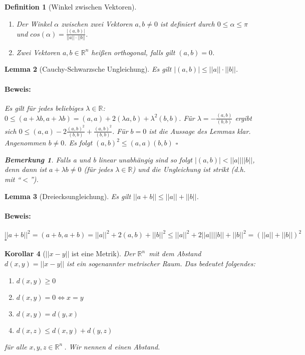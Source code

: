 \documentclass{report}
\newcommand{\lb}{\lambda}
\newcommand{\R}{\mathbb{R}}
\newcommand{\Rn}{\mathbb{R}^n\ }
\newcommand{\mRn}{$\mathbb{R}^n$\ }
\newcommand{\al}{\alpha}
\theoremstyle{customrem}
\newtheorem*{bem}{Bemerkung}
\theoremstyle{customdef}
\newtheorem{definition}{Definition}[chapter]
\newtheorem{lem}[definition]{Lemma}
\newtheorem{kor}[definition]{Korollar}
\renewenvironment{proof}{\vspace{-.75cm}\paragraph{Beweis: }}{\hfill$\square$}
\begin{document}
	\begin{definition}[Winkel zwischen Vektoren]$ $\vspace{-.5cm}
		\begin{enumerate}
			\item Der Winkel $\al$ zwischen zwei Vektoren $a, b \neq 0$ ist definiert durch $0 \le \al \le \pi$ und $cos(\al) = \frac{|(a,b)|}{||a||\cdot ||b||}$.
			\item Zwei Vektoren $a, b \in \R^n$ heißen orthogonal, falls gilt $(a, b) = 0$.
		\end{enumerate}
	\end{definition}
	\begin{lem}[Cauchy-Schwarzsche Ungleichung]
		Es gilt $|(a, b)| \le ||a||\cdot||b||$.\\
		\begin{proof}
			Es gilt für jedes beliebiges $\lb \in \R$:
			$0 \le (a + \lb b, a + \lb b) = (a, a) + 2 (\lb a, b) + \lb^2 (b, b)$.	Für $\lb = -\frac{(a,b)}{(b, b)}$ ergibt sich $0 \le (a, a) - 2 \frac{(a, b)^2}{(b, b)} + \frac{(a, b)^2}{(b, b)}$.
			Für $b = 0$ ist die Aussage des Lemmas klar. Angenommen $b \neq 0$. Es folgt 
			$(a,b)^2 \le (a, a)(b,b)$
		\end{proof} 
		\begin{bem}
			Falls a und b linear unabhängig sind so folgt $|(a,b)| < ||a||||b||$, denn dann ist $a + \lb b \neq 0$ (für jedes $\lb \in \R$) und die Ungleichung ist strikt (d.h. mit "`$<$"').
		\end{bem}
	\end{lem}
	\begin{lem}[Dreiecksungleichung]
		Es gilt $||a+b|| \le ||a|| + ||b||$.\\
		\begin{proof}
			$ ||a+b||^2 = (a+b, a+b)= ||a||^2 + 2(a,b) + ||b||^2 \le ||a||^2 + 2 ||a||||b|| + ||b||^2 = (||a|| + ||b||)^2$
		\end{proof}
		
	\end{lem}
	\begin{kor}[$||x-y||$ ist eine Metrik]
		Der \mRn mit dem Abstand $d(x, y) = ||x - y||$ ist ein sogenannter metrischer Raum. Das bedeutet folgendes:
		\begin{enumerate}
			\itemsep0cm
			\item $d(x, y) \ge 0$
			\item $d(x, y) = 0 \Leftrightarrow x = y$
			\item $d(x, y) = d(y, x)$
			\item $d(x, z) \le d(x,y) + d(y,z)$
		\end{enumerate}
		für alle $x, y, z \in \Rn$.	Wir nennen $d$ einen Abstand.
	\end{kor}
\end{document}
